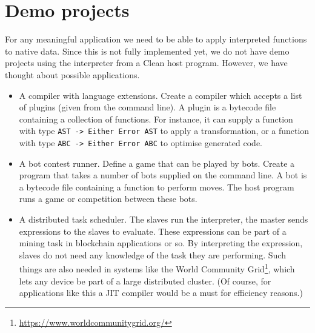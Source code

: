 \documentclass[a4paper]{article}
\begin{document}
\section*{Demo projects}
For any meaningful application we need to be able to apply interpreted functions to native data.
Since this is not fully implemented yet, we do not have demo projects using the interpreter from a Clean host program.
However, we have thought about possible applications.

\begin{itemize}
	\item
		A compiler with language extensions.
		Create a compiler which accepts a list of plugins (given from the command line).
		A plugin is a bytecode file containing a collection of functions.
		For instance, it can supply a function with type \texttt{AST -> Either Error AST} to apply a transformation,
			or a function with type \texttt{ABC -> Either Error ABC} to optimise generated code.

	\item
		A bot contest runner.
		Define a game that can be played by bots.
		Create a program that takes a number of bots supplied on the command line.
		A bot is a bytecode file containing a function to perform moves.
		The host program runs a game or competition between these bots.

	\item
		A distributed task scheduler.
		The slaves run the interpreter, the master sends expressions to the slaves to evaluate.
		These expressions can be part of a mining task in blockchain applications or so.
		By interpreting the expression, slaves do not need any knowledge of the task they are performing.
		Such things are also needed in systems like the World Community Grid\footnote{\url{https://www.worldcommunitygrid.org/}},
			which lets any device be part of a large distributed cluster.
		(Of course, for applications like this a JIT compiler would be a must for efficiency reasons.)
\end{itemize}
\end{document}
